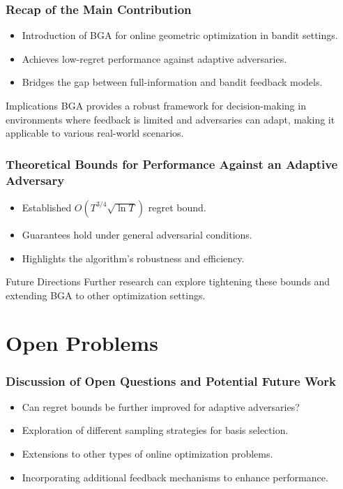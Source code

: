 \documentclass{beamer}
\begin{document}
\begin{frame}
\frametitle{Recap of the Main Contribution}
\begin{itemize}
    \item Introduction of BGA for online geometric optimization in bandit settings.
    \item Achieves low-regret performance against adaptive adversaries.
    \item Bridges the gap between full-information and bandit feedback models.
\end{itemize}
\begin{block}{Implications}
    BGA provides a robust framework for decision-making in environments where feedback is limited and adversaries can adapt, making it applicable to various real-world scenarios.
\end{block}
\end{frame}

\begin{frame}
\frametitle{Theoretical Bounds for Performance Against an Adaptive Adversary}
\begin{itemize}
    \item Established \( O(T^{3/4} \sqrt{\ln T}) \) regret bound.
    \item Guarantees hold under general adversarial conditions.
    \item Highlights the algorithm's robustness and efficiency.
\end{itemize}
\begin{block}{Future Directions}
    Further research can explore tightening these bounds and extending BGA to other optimization settings.
\end{block}
\end{frame}

\section{Open Problems}

\begin{frame}
\frametitle{Discussion of Open Questions and Potential Future Work}
\begin{itemize}
    \item Can regret bounds be further improved for adaptive adversaries?
    \item Exploration of different sampling strategies for basis selection.
    \item Extensions to other types of online optimization problems.
    \item Incorporating additional feedback mechanisms to enhance performance.
\end{itemize}
\end{frame}
\end{document}
